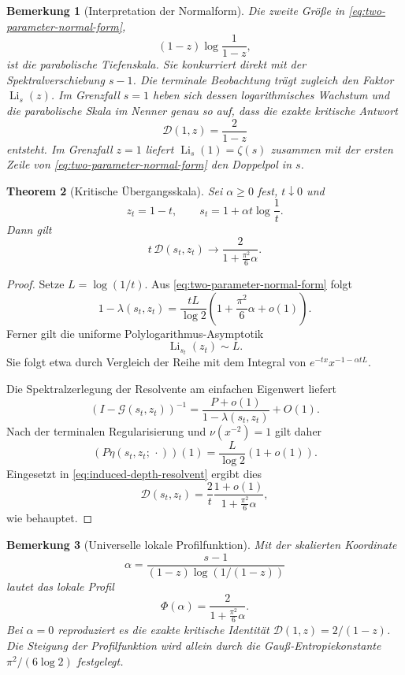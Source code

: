 \documentclass[11pt,a4paper]{article}
\newtheorem{remark}{Bemerkung}[section]
\newtheorem{theorem}[remark]{Theorem}
\begin{document}
\begin{remark}[Interpretation der Normalform]
Die zweite Größe in \eqref{eq:two-parameter-normal-form},
\[
 (1-z)\log\frac1{1-z},
\]
ist die parabolische Tiefenskala. Sie konkurriert direkt mit der
Spektralverschiebung $s-1$. Die terminale Beobachtung trägt zugleich
den Faktor $\operatorname{Li}_s(z)$. Im Grenzfall $s=1$ heben sich
dessen logarithmisches Wachstum und die parabolische Skala im Nenner
genau so auf, dass die exakte kritische Antwort
\[
 \mathscr D(1,z)=\frac2{1-z}
\]
entsteht. Im Grenzfall $z=1$ liefert
$\operatorname{Li}_s(1)=\zeta(s)$ zusammen mit der ersten Zeile von
\eqref{eq:two-parameter-normal-form} den Doppelpol in $s$.
\end{remark}


\begin{theorem}[Kritische Übergangsskala]
Sei $\alpha\ge0$ fest, $t\downarrow0$ und
\[
 z_t=1-t,
 \qquad
 s_t=1+\alpha t\log\frac1t.
\]
Dann gilt
\[
 t\,\mathscr D(s_t,z_t)
 \longrightarrow
 \frac{2}{1+\frac{\pi^2}{6}\alpha}.
\]
\end{theorem}

\begin{proof}
Setze $L=\log(1/t)$. Aus \eqref{eq:two-parameter-normal-form} folgt
\[
 1-\lambda(s_t,z_t)
 =
 \frac{tL}{\log2}
 \left(1+\frac{\pi^2}{6}\alpha+o(1)\right).
\]
Ferner gilt die uniforme Polylogarithmus-Asymptotik
\[
 \operatorname{Li}_{s_t}(z_t)\sim L.
\]
Sie folgt etwa durch Vergleich der Reihe mit dem Integral von
$e^{-tx}x^{-1-\alpha tL}$.

Die Spektralzerlegung der Resolvente am einfachen Eigenwert liefert
\[
 (I-\mathcal G(s_t,z_t))^{-1}
 =
 \frac{P+o(1)}{1-\lambda(s_t,z_t)}+O(1).
\]
Nach der terminalen Regularisierung und
$\nu(x^{-2})=1$ gilt daher
\[
 (P\eta(s_t,z_t;\,\cdot))(1)
 =
 \frac{L}{\log2}(1+o(1)).
\]
Eingesetzt in \eqref{eq:induced-depth-resolvent} ergibt dies
\[
 \mathscr D(s_t,z_t)
 =
 \frac{2}{t}
 \frac{1+o(1)}{1+\frac{\pi^2}{6}\alpha},
\]
wie behauptet.
\end{proof}

\begin{remark}[Universelle lokale Profilfunktion]
Mit der skalierten Koordinate
\[
 \alpha
 =
 \frac{s-1}{(1-z)\log(1/(1-z))}
\]
lautet das lokale Profil
\[
 \Phi(\alpha)=\frac{2}{1+\frac{\pi^2}{6}\alpha}.
\]
Bei $\alpha=0$ reproduziert es die exakte kritische Identität
$\mathscr D(1,z)=2/(1-z)$. Die Steigung der Profilfunktion wird allein
durch die Gauß-Entropiekonstante $\pi^2/(6\log2)$ festgelegt.
\end{remark}
\end{document}
